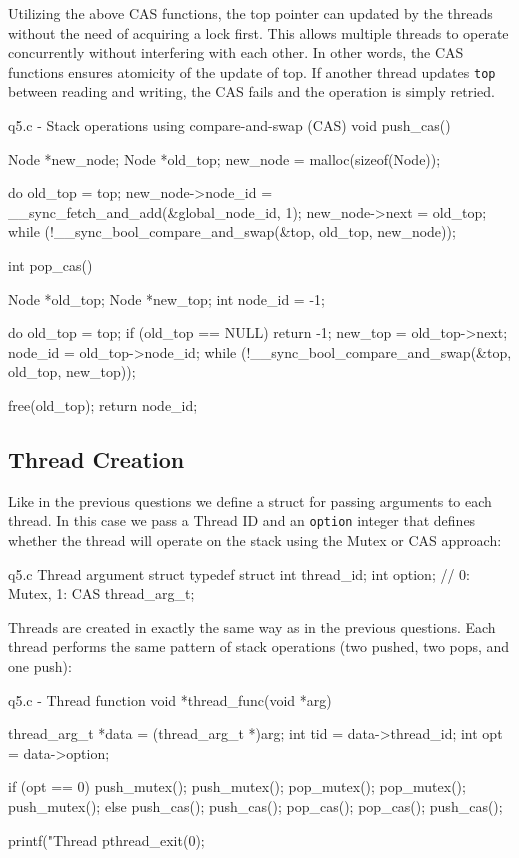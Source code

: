 \documentclass[../main.tex]{subfiles}
\begin{document}
Utilizing the above CAS functions, the top pointer can updated by the threads without the need of acquiring a lock first. This allows multiple threads to operate concurrently without interfering with each other. In other words, the CAS functions ensures atomicity of the update of top. If another thread updates \texttt{top} between reading and writing, the CAS fails and the operation is simply retried.

\begin{cppcode}{q5.c - Stack operations using compare-and-swap (CAS)}
void push_cas() {
    Node *new_node;
    Node *old_top;
    new_node = malloc(sizeof(Node));

    do {
        old_top = top;
        new_node->node_id = __sync_fetch_and_add(&global_node_id, 1);
        new_node->next = old_top;
    } while (!__sync_bool_compare_and_swap(&top, old_top, new_node));
}

int pop_cas() {
    Node *old_top;
    Node *new_top;
    int node_id = -1;

    do {
        old_top = top;
        if (old_top == NULL)
        {
            return -1;
        }
        new_top = old_top->next;
        node_id = old_top->node_id;
    } while (!__sync_bool_compare_and_swap(&top, old_top, new_top));

    free(old_top);
    return node_id;
}
\end{cppcode}

\subsection*{Thread Creation}

Like in the previous questions we define a struct for passing arguments to each thread. In this case we pass a Thread ID and an \texttt{option} integer that defines whether the thread will operate on the stack using the Mutex or CAS approach:

\begin{cppcode}{q5.c Thread argument struct}
typedef struct {
    int thread_id;
    int option;     // 0: Mutex, 1: CAS
} thread_arg_t;
\end{cppcode}

Threads are created in exactly the same way as in the previous questions. Each thread performs the same pattern of stack operations (two pushed, two pops, and one push):

\begin{cppcode}{q5.c - Thread function}
void *thread_func(void *arg) {
    thread_arg_t *data = (thread_arg_t *)arg;
    int tid = data->thread_id;
    int opt = data->option;

    if (opt == 0)
    {
        push_mutex();
        push_mutex();
        pop_mutex();
        pop_mutex();
        push_mutex();
    }
    else
    {
        push_cas();
        push_cas();
        pop_cas();
        pop_cas();
        push_cas();
    }

    printf("Thread %
    pthread_exit(0);
}
\end{cppcode}
\end{document}
